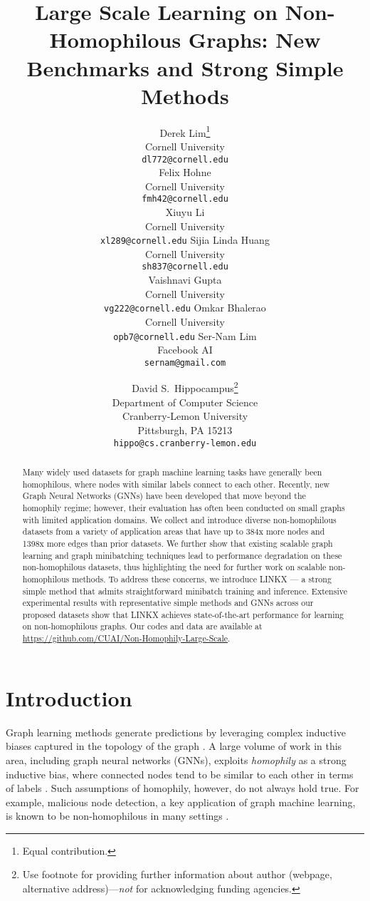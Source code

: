 \documentclass{article}
\title{Large Scale Learning on Non-Homophilous Graphs: New Benchmarks and Strong Simple Methods}
\author{Derek Lim\thanks{Equal contribution. }\\
  Cornell University\\
  \texttt{dl772@cornell.edu} \\
  \And
  Felix Hohne
 \\
  Cornell University \\
  \texttt{fmh42@cornell.edu} \\
  \And 
  Xiuyu Li
  \\ Cornell University 
  \\ \texttt{xl289@cornell.edu}
  \AND 
  Sijia Linda Huang \\
  Cornell University \\
  \texttt{sh837@cornell.edu}
  
  \And 
  Vaishnavi Gupta 
  \\ 
  Cornell University 
  \\ \texttt{vg222@cornell.edu}
  \And 
  Omkar Bhalerao
  \\ Cornell University \\
  \texttt{opb7@cornell.edu}
  \And 
  Ser-Nam Lim 
  \\ Facebook AI 
  \\ \texttt{sernam@gmail.com}
}
\begin{document}
\maketitle



\author{David S.~Hippocampus\thanks{Use footnote for providing further information
    about author (webpage, alternative address)---\emph{not} for acknowledging
    funding agencies.} \\
  Department of Computer Science\\
  Cranberry-Lemon University\\
  Pittsburgh, PA 15213 \\
  \texttt{hippo@cs.cranberry-lemon.edu} \\
}

\maketitle

\begin{abstract}
  Many widely used datasets for graph machine learning tasks have generally been homophilous, where nodes with similar labels connect to each other. Recently, new Graph Neural Networks (GNNs) have been developed that move beyond the homophily regime; however, their evaluation has often been conducted on small graphs with limited application domains. We collect and introduce diverse non-homophilous datasets from a variety of application areas that have up to 384x more nodes and 1398x more edges than prior datasets. We further show that existing scalable graph learning and graph minibatching techniques lead to performance degradation on these non-homophilous datasets, thus highlighting the need for further work on scalable non-homophilous methods. To address these concerns, we introduce LINKX --- a strong simple method that admits straightforward minibatch training and inference. Extensive experimental results with representative simple methods and GNNs across our proposed datasets show that LINKX achieves state-of-the-art performance for learning on non-homophilous graphs. Our codes and data are available at \url{https://github.com/CUAI/Non-Homophily-Large-Scale}.
\end{abstract}

\section{Introduction}

Graph learning methods generate predictions by leveraging complex inductive biases captured in the topology of the graph \cite{battaglia2018relational}. A large volume of work in this area, including graph neural networks (GNNs), exploits \textit{homophily} as a strong inductive bias, where connected nodes tend to be similar to each other in terms of labels \cite{mcpherson2001birds, altenburger2018monophily}. Such assumptions of homophily, however, do not always hold true. For example, malicious node detection, a key application of graph machine learning, is known to be non-homophilous in many settings \cite{pandit2007netprobe, chau2006detecting, gatterbauer2014semi, breuer2020friend}. 
\end{document}
